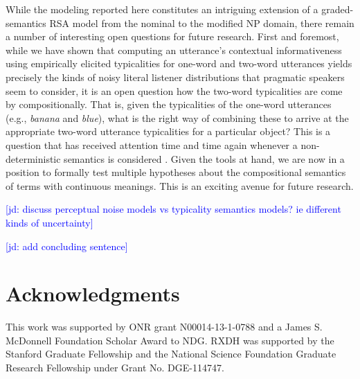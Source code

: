 \documentclass[10pt,letterpaper]{article}
\newcommand{\jd}[1]{\textcolor{Blue}{[jd: #1]}}
\begin{document}
While the modeling reported here constitutes an intriguing extension of a graded-semantics RSA model from the nominal \cite{GrafEtAl2016} to the modified NP domain, there remain a number of interesting open questions for future research. First and foremost, while we have shown that computing an utterance's contextual informativeness using empirically elicited typicalities for one-word and two-word utterances yields precisely the kinds of noisy literal listener distributions that pragmatic speakers seem to consider, it is an open question how the two-word typicalities are come by compositionally. That is, given the typicalities of the one-word utterances (e.g., \emph{banana} and \emph{blue}), what is the right way of combining these to arrive at the appropriate two-word utterance typicalities for a particular object? This is a question that has received attention time and time again whenever a non-deterministic semantics is considered \cite{Kamp1995}. Given the tools at hand, we are now in a position to formally test multiple hypotheses about the compositional semantics of terms with continuous meanings. This is an exciting avenue for future research.

\jd{discuss perceptual noise models vs typicality semantics models? ie different kinds of uncertainty}

\jd{add concluding sentence}





\section{\bf Acknowledgments}
\small
This work was supported by ONR grant N00014-13-1-0788 and a James S. McDonnell Foundation Scholar Award to NDG. RXDH was supported by the Stanford Graduate Fellowship and the National Science Foundation Graduate Research Fellowship under Grant No. DGE-114747.





\setlength{\bibleftmargin}{.125in}
\setlength{\bibindent}{-\bibleftmargin}


\end{document}
